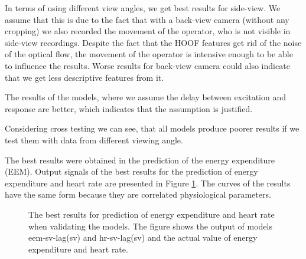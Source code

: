 In terms of using different view angles, we get best results for side-view. We assume that this is due to the fact that with a back-view camera (without any cropping) we also recorded the movement of the operator, who is not visible in side-view recordings. Despite the fact that the HOOF features get rid of the noise of the optical flow, the movement of the operator is intensive enough to be able to influence the results. Worse results for back-view camera could also indicate that we get less descriptive features from it. 

The results of the models, where we assume the delay between excitation and response are better, which indicates that the assumption is justified.

Considering cross testing we can see, that all models produce poorer results if we test them with data from different viewing angle.

The best results were obtained in the prediction of the energy expenditure (EEM). Output signals of the best results for the prediction of energy expenditure and heart rate are presented in Figure \ref{fig:rezultat}. The curves of the results have the same form because they are correlated physiological parameters.

\begin{figure}[!htb]
	\centering
    \caption{The best results for prediction of energy expenditure and heart rate when validating the models. The figure shows the output of models eem-sv-lag(sv) and hr-sv-lag(sv) and the actual value of energy expenditure and heart rate.}
    \label{fig:rezultat}
\end{figure}

